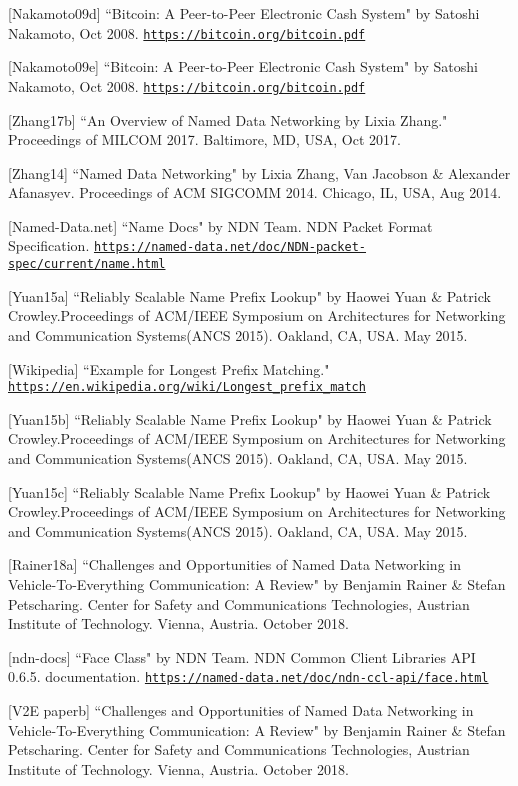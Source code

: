 [Nakamoto09d] ``Bitcoin: A Peer-to-Peer Electronic Cash System" by Satoshi Nakamoto, Oct 2008.  \texttt{\url{https://bitcoin.org/bitcoin.pdf}}


[Nakamoto09e] ``Bitcoin: A Peer-to-Peer Electronic Cash System" by Satoshi Nakamoto, Oct 2008.  \texttt{\url{https://bitcoin.org/bitcoin.pdf}}


[Zhang17b] ``An Overview of Named Data Networking by Lixia Zhang." Proceedings of
MILCOM 2017. Baltimore, MD, USA, Oct 2017. 

[Zhang14] ``Named Data Networking" by Lixia Zhang, Van Jacobson \& Alexander Afanasyev. Proceedings of ACM SIGCOMM 2014. Chicago, IL, USA, Aug 2014.

[Named-Data.net] ``Name Docs" by NDN Team. NDN Packet Format Specification. \texttt{\url{https://named-data.net/doc/NDN-packet-spec/current/name.html}}

[Yuan15a] ``Reliably Scalable Name Prefix Lookup" by Haowei Yuan \& Patrick Crowley.Proceedings of ACM/IEEE Symposium on Architectures for Networking and Communication Systems(ANCS 2015). Oakland, CA, USA.	May 2015.

[Wikipedia] ``Example for Longest Prefix Matching." \texttt{\url{https://en.wikipedia.org/wiki/Longest_prefix_match}}

[Yuan15b] ``Reliably Scalable Name Prefix Lookup" by Haowei Yuan \& Patrick Crowley.Proceedings of ACM/IEEE Symposium on Architectures for Networking and Communication Systems(ANCS 2015). Oakland, CA, USA.	May 2015.

[Yuan15c] ``Reliably Scalable Name Prefix Lookup" by Haowei Yuan \& Patrick Crowley.Proceedings of ACM/IEEE Symposium on Architectures for Networking and Communication Systems(ANCS 2015). Oakland, CA, USA.	May 2015.

[Rainer18a] ``Challenges and Opportunities of Named Data Networking in Vehicle-To-Everything Communication: A Review" by Benjamin Rainer \& Stefan Petscharing. Center for Safety and Communications Technologies, Austrian Institute of Technology. Vienna, Austria. October 2018.


[ndn-docs] ``Face Class" by NDN Team. NDN Common Client Libraries API 0.6.5. documentation. \texttt{\url{https://named-data.net/doc/ndn-ccl-api/face.html}}

[V2E paperb] ``Challenges and Opportunities of Named Data Networking in Vehicle-To-Everything Communication: A Review" by Benjamin Rainer \& Stefan Petscharing. Center for Safety and Communications Technologies, Austrian Institute of Technology. Vienna, Austria. October 2018.



